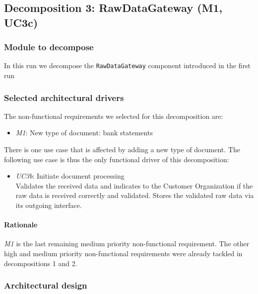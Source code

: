 \documentclass[a4paper,10pt]{article}
\begin{document}
\subsection{Decomposition 3: RawDataGateway (M1, UC3c)}
\subsubsection{Module to decompose}
In this run we decompose the \texttt{RawDataGateway} component  introduced in the first run

\subsubsection{Selected architectural drivers}
The non-functional requirements we selected for this decomposition are:
\begin{itemize}
	\item \emph{M1}: New type of document: bank statements
\end{itemize}
There is one use case that is affected by adding a new type of document. The following use case is thus the only functional driver of this decomposition:
\begin{itemize}
	\item \emph{UC3b}: Initiate document processing\\ Validates the received data and indicates to the Customer Organization if the raw data is received correctly and validated. Stores the validated raw data via its outgoing interface.
\end{itemize}

\paragraph{Rationale} \emph{M1} is the last remaining medium priority non-functional requirement. The other high and medium priority non-functional requirements were already tackled in decompositions 1 and 2. 
\subsubsection{Architectural design}
\end{document}
